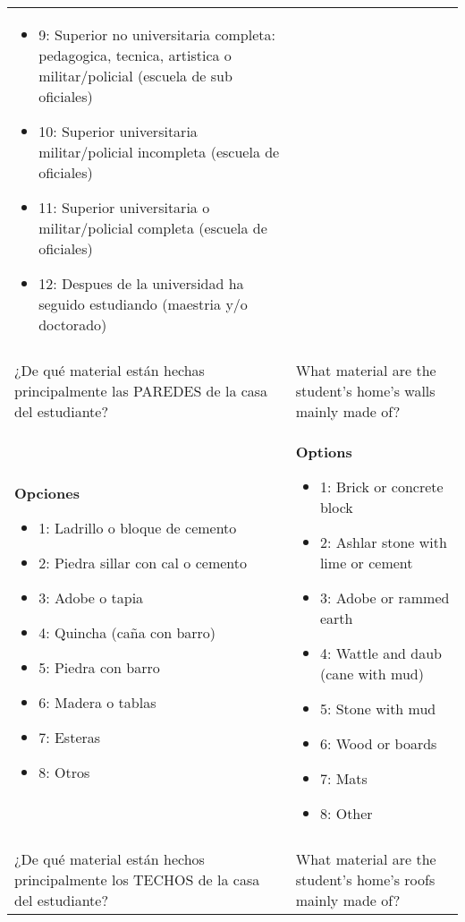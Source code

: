 \documentclass[11pt]{article}
\begin{document}
\begin{longtable}{@{}LL@{}}
\begin{itemize}[leftmargin=*]
\item 9: Superior no universitaria completa: pedagogica, tecnica, artistica o militar/policial (escuela de sub oficiales)
\item 10: Superior universitaria militar/policial incompleta (escuela de oficiales)
\item 11: Superior universitaria o militar/policial completa (escuela de oficiales)
\item 12: Despues de la universidad ha seguido estudiando (maestria y/o doctorado)\end{itemize} \\
\addlinespace[4pt]
 \\ 
¿De qué material están hechas principalmente las PAREDES de la casa del estudiante? & What material are the student's home's walls mainly made of? \\
\textbf{Opciones}\par\begin{itemize}[leftmargin=*]\item 1: Ladrillo o bloque de cemento
\item 2: Piedra sillar con cal o cemento
\item 3: Adobe o tapia
\item 4: Quincha (caña con barro)
\item 5: Piedra con barro
\item 6: Madera o tablas
\item 7: Esteras
\item 8: Otros\end{itemize} & \textbf{Options}\par\begin{itemize}[leftmargin=*]\item 1: Brick or concrete block
\item 2: Ashlar stone with lime or cement
\item 3: Adobe or rammed earth
\item 4: Wattle and daub (cane with mud)
\item 5: Stone with mud
\item 6: Wood or boards
\item 7: Mats
\item 8: Other\end{itemize} \\
\addlinespace[4pt]
 \\ 
¿De qué material están hechos principalmente los TECHOS de la casa del estudiante? & What material are the student's home's roofs mainly made of? \\

\end{longtable}
\end{document}
